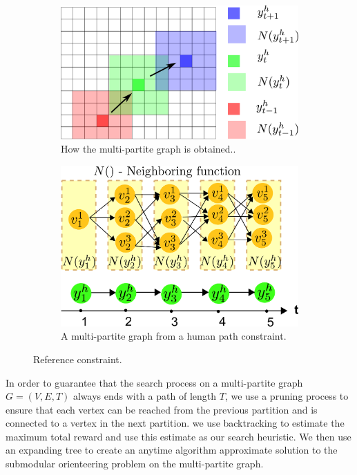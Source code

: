 \documentclass[phd]{byuprop}
\begin{document}
\begin{figure}[htbp]
	\centering
	\begin{subfigure}[t]{0.45\linewidth}
		\centering
		\includegraphics[width=\textwidth]{fig/humanConstraint.pdf}
		\caption{How the multi-partite graph is obtained..}
		\label{fig:humanConstraint}
	\end{subfigure}  
	\begin{subfigure}[t]{0.45\linewidth}
		\centering
		\includegraphics[width=\textwidth]{fig/MultiPartite.pdf}
		\caption{A multi-partite graph from a human path constraint.}
		\label{fig:MultiPartite}
	\end{subfigure}   
	\caption{Reference constraint.}
	\label{fig:reference_constraint}
\end{figure}

In order to guarantee that the search process on a multi-partite graph $ G = (V, E, T) $ always ends with a path of length $ T $, we use a pruning process to ensure that each vertex can be reached from the previous partition and is connected to a vertex in the next partition.
we use backtracking to estimate the maximum total reward and use this estimate as our search heuristic.
We then use an expanding tree to create an anytime algorithm approximate solution to the submodular orienteering problem on the multi-partite graph.
\end{document}
